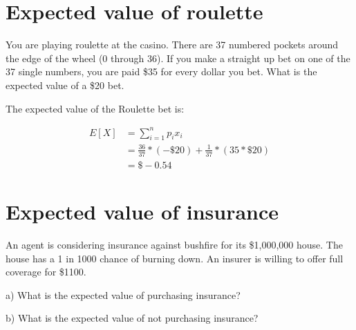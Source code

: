 \documentclass[
  letterpaper,
  DIV=11,
  numbers=noendperiod]{scrreprt}
\begin{document}
\hypertarget{expected-value-of-roulette}{%
\section{Expected value of roulette}\label{expected-value-of-roulette}}

You are playing roulette at the casino. There are 37 numbered pockets
around the edge of the wheel (0 through 36). If you make a straight up
bet on one of the 37 single numbers, you are paid \$35 for every dollar
you bet. What is the expected value of a \$20 bet.

\begin{tcolorbox}[enhanced jigsaw, title=\textcolor{quarto-callout-tip-color}{\faLightbulb}\hspace{0.5em}{Answer}, toprule=.15mm, colback=white, breakable, titlerule=0mm, colframe=quarto-callout-tip-color-frame, coltitle=black, opacityback=0, rightrule=.15mm, colbacktitle=quarto-callout-tip-color!10!white, bottomtitle=1mm, opacitybacktitle=0.6, arc=.35mm, bottomrule=.15mm, toptitle=1mm, leftrule=.75mm, left=2mm]

The expected value of the Roulette bet is:

\begin{align*}
E[X]&=\sum_{i=1}^n p_ix_i \\[6pt]
&=\frac{36}{37}*(-\$20)+\frac{1}{37}*(35*\$20) \\[6pt]
&=\$-0.54
\end{align*}

\end{tcolorbox}

\hypertarget{expected-value-of-insurance}{%
\section{Expected value of
insurance}\label{expected-value-of-insurance}}

An agent is considering insurance against bushfire for its \$1,000,000
house. The house has a 1 in 1000 chance of burning down. An insurer is
willing to offer full coverage for \$1100.

a) What is the expected value of purchasing insurance?

b) What is the expected value of not purchasing insurance?
\end{document}

